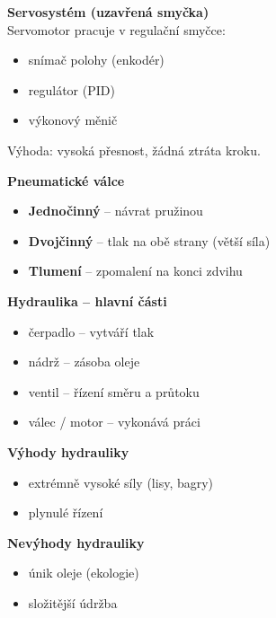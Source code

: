 \documentclass[a4paper,10pt]{article}
\begin{document}
\begin{vysvetlenibox}
\begin{center}
\textbf{Servosystém (uzavřená smyčka)}\\
Servomotor pracuje v regulační smyčce:
\begin{itemize}[noitemsep, leftmargin=1.4em, topsep=4pt]
    \item snímač polohy (enkodér)
    \item regulátor (PID)
    \item výkonový měnič
\end{itemize}
Výhoda: vysoká přesnost, žádná ztráta kroku.

\textbf{Pneumatické válce}
\begin{itemize}[noitemsep, leftmargin=1.4em, topsep=4pt]
    \item \textbf{Jednočinný} -- návrat pružinou
    \item \textbf{Dvojčinný} -- tlak na obě strany (větší síla)
    \item \textbf{Tlumení} -- zpomalení na konci zdvihu
\end{itemize}

\textbf{Hydraulika -- hlavní části}
\begin{itemize}[noitemsep, leftmargin=1.4em, topsep=4pt]
    \item čerpadlo -- vytváří tlak
    \item nádrž -- zásoba oleje
    \item ventil -- řízení směru a průtoku
    \item válec / motor -- vykonává práci
\end{itemize}

\textbf{Výhody hydrauliky}
\begin{itemize}[noitemsep, leftmargin=1.4em, topsep=4pt]
    \item extrémně vysoké síly (lisy, bagry)
    \item plynulé řízení
\end{itemize}

\textbf{Nevýhody hydrauliky}
\begin{itemize}[noitemsep, leftmargin=1.4em, topsep=4pt]
    \item únik oleje (ekologie)
    \item složitější údržba
\end{itemize}

\end{center}
\end{vysvetlenibox}


\end{document}
